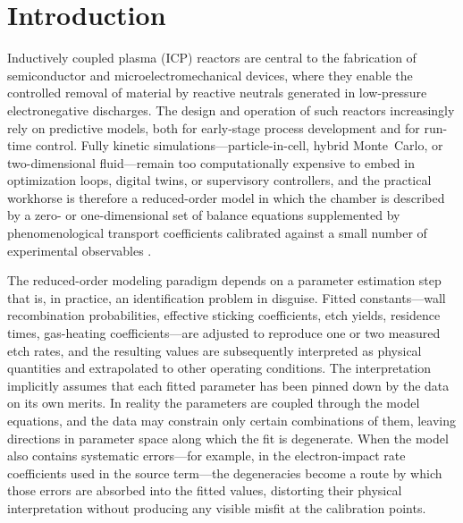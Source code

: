\section{Introduction}
\label{sec:intro}

Inductively coupled plasma (ICP) reactors are central to the
fabrication of semiconductor and microelectromechanical devices,
where they enable the controlled removal of material by reactive
neutrals generated in low-pressure electronegative discharges. The
design and operation of such reactors increasingly rely on
predictive models, both for early-stage process development and for
run-time control. Fully kinetic simulations---particle-in-cell,
hybrid Monte~Carlo, or two-dimensional fluid---remain too
computationally expensive to embed in optimization loops, digital
twins, or supervisory controllers, and the practical workhorse is
therefore a reduced-order model in which the chamber is described
by a zero- or one-dimensional set of balance equations supplemented
by phenomenological transport coefficients calibrated against a
small number of experimental observables
\citep{lieberman2005,chabert2011}.

The reduced-order modeling paradigm depends on a parameter
estimation step that is, in practice, an identification problem in
disguise. Fitted constants---wall recombination probabilities,
effective sticking coefficients, etch yields, residence times,
gas-heating coefficients---are adjusted to reproduce one or two
measured etch rates, and the resulting values are subsequently
interpreted as physical quantities and extrapolated to other
operating conditions. The interpretation implicitly assumes that
each fitted parameter has been pinned down by the data on its own
merits. In reality the parameters are coupled through the model
equations, and the data may constrain only certain combinations of
them, leaving directions in parameter space along which the fit is
degenerate. When the model also contains systematic errors---for
example, in the electron-impact rate coefficients used in the source
term---the degeneracies become a route by which those errors are
absorbed into the fitted values, distorting their physical
interpretation without producing any visible misfit at the
calibration points.

